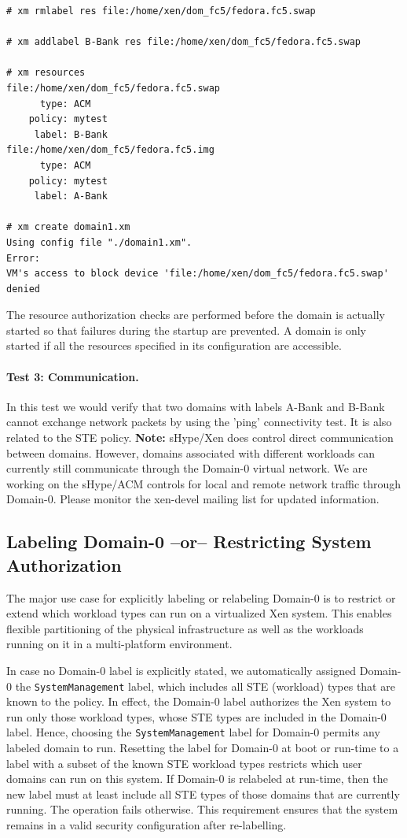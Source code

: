 \documentclass[11pt,twoside,final,openright]{report}
\begin{document}
\begin{scriptsize}
\begin{verbatim}
# xm rmlabel res file:/home/xen/dom_fc5/fedora.fc5.swap

# xm addlabel B-Bank res file:/home/xen/dom_fc5/fedora.fc5.swap

# xm resources
file:/home/xen/dom_fc5/fedora.fc5.swap
      type: ACM
    policy: mytest
     label: B-Bank
file:/home/xen/dom_fc5/fedora.fc5.img
      type: ACM
    policy: mytest
     label: A-Bank

# xm create domain1.xm
Using config file "./domain1.xm".
Error:
VM's access to block device 'file:/home/xen/dom_fc5/fedora.fc5.swap' denied
\end{verbatim}
\end{scriptsize}

The resource authorization checks are performed before the domain is actually started
so that failures during the startup are prevented. A domain is only started if all
the resources specified in its configuration are accessible.

\paragraph{Test 3: Communication.} In this test we would verify that
two domains with labels A-Bank and B-Bank cannot exchange network packets
by using the 'ping' connectivity test. It is also related to the STE
policy. {\bf Note:} sHype/Xen does control direct communication between
domains. However, domains associated with different workloads can
currently still communicate through the Domain-0 virtual network. We
are working on the sHype/ACM controls for local and remote network
traffic through Domain-0. Please monitor the xen-devel mailing list
for updated information.


\subsection{Labeling Domain-0 --or-- Restricting System Authorization}
\label{subsection:acmlabeldom0}
The major use case for explicitly labeling or relabeling Domain-0 is to restrict
or extend which workload types can run on a virtualized Xen system. This enables
flexible partitioning of the physical infrastructure as well as the workloads
running on it in a multi-platform environment.

In case no Domain-0 label is explicitly stated, we automatically assigned Domain-0
the \verb|SystemManagement| label, which includes all STE (workload) types that
are known to the policy. In effect, the Domain-0 label authorizes the Xen system
to run only those workload types, whose STE types are included in the Domain-0
label. Hence, choosing the \verb|SystemManagement| label for Domain-0 permits any
labeled domain to run. Resetting the label for Domain-0 at boot or run-time to
a label with a subset of the known STE workload types restricts which user domains
can run on this system. If Domain-0 is relabeled at run-time, then the new label
must at least include all STE types of those domains that are currently running.
The operation fails otherwise. This requirement ensures that the system remains
in a valid security configuration after re-labelling.
\end{document}
